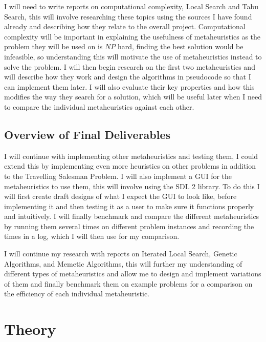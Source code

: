 \documentclass[]{final_report}
\begin{document}
I will need to write reports on computational complexity, Local Search and Tabu Search, this will involve researching these topics using the sources I have found already and describing how they relate to the overall project. Computational complexity will be important in explaining the usefulness of metaheuristics as the problem they will be used on is $NP$ hard, finding the best solution would be infeasible, so understanding this will motivate the use of metaheuristics instead to solve the problem. I will then begin research on the first two metaheuristics and will describe how they work and design the algorithms in pseudocode so that I can implement them later. I will also evaluate their key properties and how this modifies the way they search for a solution, which will be useful later when I need to compare the individual metaheuristics against each other.

\section*{Overview of Final Deliverables}

I will continue with implementing other metaheuristics and testing them, I could extend this by implementing even more heuristics on other problems in addition to the Travelling Salesman Problem. I will also implement a GUI for the metaheuristics to use them, this will involve using the SDL 2 library. To do this I will first create draft designs of what I expect the GUI to look like, before implementing it and then testing it as a user to make sure it functions properly and intuitively. I will finally benchmark and compare the different metaheuristics by running them several times on different problem instances and recording the times in a log, which I will then use for my comparison.

I will continue my research with reports on Iterated Local Search, Genetic Algorithms, and Memetic Algorithms, this will further my understanding of different types of metaheuristics and allow me to design and implement variations of them and finally benchmark them on example problems for a comparison on the efficiency of each individual metaheuristic.

\chapter*{Theory}
\end{document}
